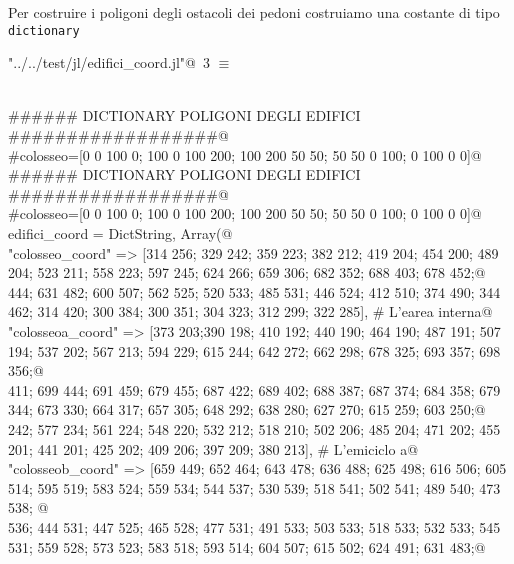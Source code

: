 \documentclass[]{article}
\begin{document}
Per costruire i poligoni degli ostacoli dei pedoni costruiamo una costante di tipo  {\tt dictionary} 
\begin{flushleft} \small
\begin{minipage}{\linewidth} \label{scrap3}
\protect{}\verb@"../../test/jl/edifici_coord.jl"@\nobreak\ {\footnotesize 3 }$\equiv$
\vspace{-1ex}
\begin{list}{}{} \item
\mbox{}\verb@@\\
\mbox{}\verb@###### DICTIONARY POLIGONI DEGLI EDIFICI ##################@\\
\mbox{}\verb@#colosseo=[0 0 100 0; 100 0 100 200; 100 200 50 50; 50 50 0 100; 0 100 0 0]@\\
\mbox{}\verb@###### DICTIONARY POLIGONI DEGLI EDIFICI ##################@\\
\mbox{}\verb@#colosseo=[0 0 100 0; 100 0 100 200; 100 200 50 50; 50 50 0 100; 0 100 0 0]@\\
\mbox{}\verb@const edifici_coord = Dict{String, Array}(@\\
\mbox{}\verb@"colosseo_coord" => [314 256; 329 242; 359 223; 382 212; 419 204; 454 200; 489 204; 523 211; 558 223; 597 245; 624 266; 659 306; 682 352; 688 403; 678 452;@\\
\mbox{} 444; 631 482; 600 507; 562 525; 520 533; 485 531; 446 524; 412 510; 374 490; 344 462; 314 420; 300 384; 300 351; 304 323; 312 299; 322 285], # L'earea interna@\\
\mbox{}\verb@"colosseoa_coord" => [373 203;390 198; 410 192; 440 190; 464 190; 487 191; 507 194; 537 202; 567 213; 594 229; 615 244; 642 272; 662 298; 678 325; 693 357; 698 356;@\\
\mbox{} 411; 699 444; 691 459; 679 455; 687 422; 689 402; 688 387; 687 374; 684 358; 679 344; 673 330; 664 317; 657 305; 648 292; 638 280; 627 270; 615 259; 603 250;@\\
\mbox{} 242; 577 234; 561 224; 548 220; 532 212; 518 210; 502 206; 485 204; 471 202; 455 201; 441 201; 425 202; 409 206; 397 209; 380 213], # L'emiciclo a@\\
\mbox{}\verb@"colosseob_coord" => [659 449; 652 464; 643 478; 636 488; 625 498; 616 506; 605 514; 595 519; 583 524; 559 534; 544 537; 530 539; 518 541; 502 541; 489 540; 473 538; @\\
\mbox{} 536; 444 531; 447 525; 465 528; 477 531; 491 533; 503 533; 518 533; 532 533; 545 531; 559 528; 573 523; 583 518; 593 514; 604 507; 615 502; 624 491; 631 483;@\\

\end{list}
\end{minipage}
\end{flushleft}
\end{document}
